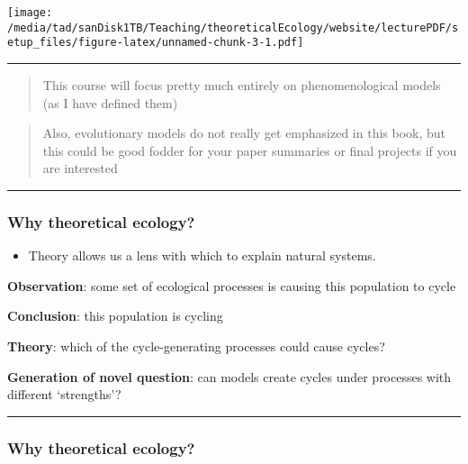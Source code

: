 \documentclass[
]{article}
\providecommand{\tightlist}{%
  \setlength{\itemsep}{0pt}\setlength{\parskip}{0pt}}
\begin{document}
\texttt{[image: /media/tad/sanDisk1TB/Teaching/theoreticalEcology/website/lecturePDF/setup\_files/figure-latex/unnamed-chunk-3-1.pdf]}

\begin{center}\rule{0.5\linewidth}{0.5pt}\end{center}

\begin{quote}
This course will focus pretty much entirely on phenomenological models
(as I have defined them)
\end{quote}

\begin{quote}
Also, evolutionary models do not really get emphasized in this book, but
this could be good fodder for your paper summaries or final projects if
you are interested
\end{quote}

\begin{center}\rule{0.5\linewidth}{0.5pt}\end{center}

\hypertarget{why-theoretical-ecology}{%
\subsubsection{Why theoretical ecology?}\label{why-theoretical-ecology}}

\begin{itemize}
\tightlist
\item
  Theory allows us a lens with which to explain natural systems.
\end{itemize}

\textbf{Observation}: some set of ecological processes is causing this
population to cycle

\textbf{Conclusion}: this population is cycling

\textbf{Theory}: which of the cycle-generating processes could cause
cycles?

\textbf{Generation of novel question}: can models create cycles under
processes with different `strengths'?

\begin{center}\rule{0.5\linewidth}{0.5pt}\end{center}

\hypertarget{why-theoretical-ecology-1}{%
\subsubsection{Why theoretical
ecology?}\label{why-theoretical-ecology-1}}
\end{document}
